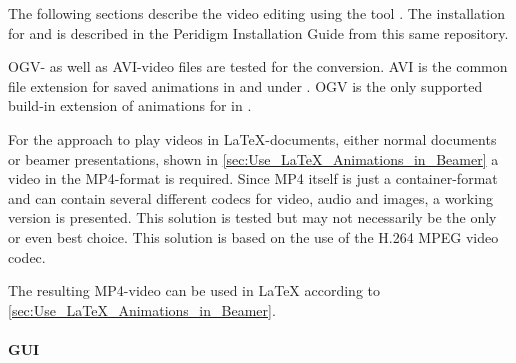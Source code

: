 \label{sec:Use_Animations_VLC}

The following sections describe the video editing using the tool \marktool{\vlcname}. The installation for \marktool{\windowsosname} and \marktool{\opensusename} is described in the Peridigm Installation Guide from this same repository.

OGV- as well as AVI-video files are tested for the conversion. AVI is the common file extension for saved animations in \marktool{\paraviewname} and \marktool{\abaqusname} under \marktool{\windowsosname}. OGV is the only supported build-in extension of animations for \marktool{\paraviewname} in \marktool{\opensusename}.

\label{sec:Use_VLC_Convert_Videos_VLC_LaTeX}

For the approach to play videos in \LaTeX-documents, either normal documents or beamer presentations, shown in \autoref{sec:Use_LaTeX_Animations_in_Beamer} a video in the MP4-format is required.  Since MP4 itself is just a container-format and can contain several different codecs for video, audio and images, a working version is presented. This solution is tested but may not necessarily be the only or even best choice. This solution is based on the use of the H.264 MPEG video codec.

The resulting MP4-video can be used in \LaTeX{} according to \autoref{sec:Use_LaTeX_Animations_in_Beamer}.

\paragraph{GUI}

